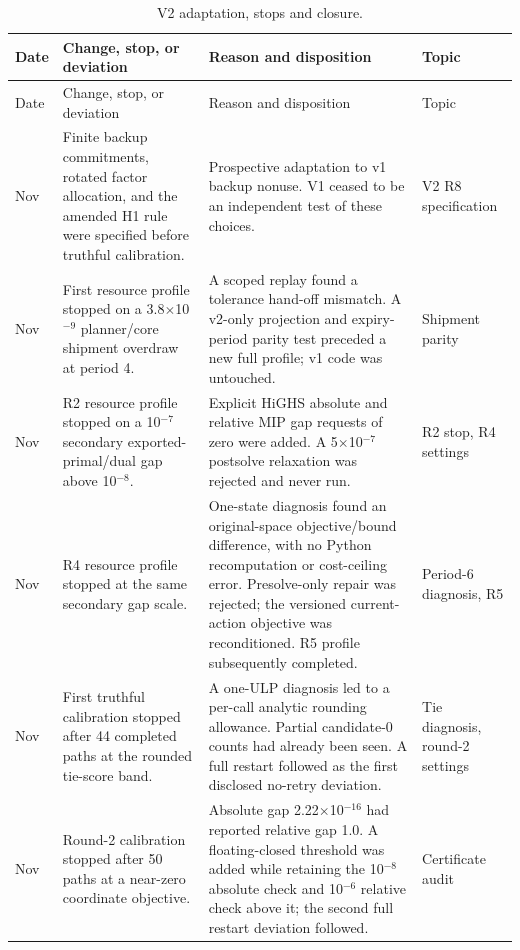 \documentclass[preprint,11pt,authoryear]{elsarticle}
\begin{document}
\begingroup\small\setlength{\tabcolsep}{4pt}\renewcommand{\arraystretch}{1.18}
\renewcommand{\thetable}{C2}
\begin{longtable}{>{\raggedright\arraybackslash}p{1.1cm}>{\raggedright\arraybackslash}p{4.6cm}>{\raggedright\arraybackslash}p{6.2cm}>{\raggedright\arraybackslash}p{2.7cm}}
\caption{V2 adaptation, stops and closure.}\label{tab:deviations2}\\
\toprule
Date & Change, stop, or deviation & Reason and disposition & Topic \\
\midrule
\endfirsthead
Date & Change, stop, or deviation & Reason and disposition & Topic \\
\midrule
\endhead
\bottomrule\endfoot
12 Nov & Finite backup commitments, rotated factor allocation, and the amended H1 rule were specified before truthful calibration. & Prospective adaptation to v1 backup nonuse. V1 ceased to be an independent test of these choices. & V2 R8 specification \\
12 Nov & First resource profile stopped on a 3.8$\times$10$^{-9}$ planner/core shipment overdraw at period 4. & A scoped replay found a tolerance hand-off mismatch. A v2-only projection and expiry-period parity test preceded a new full profile; v1 code was untouched. & Shipment parity \\
12 Nov & R2 resource profile stopped on a 10$^{-7}$ secondary exported-primal/dual gap above 10$^{-8}$. & Explicit HiGHS absolute and relative MIP gap requests of zero were added. A 5$\times$10$^{-7}$ postsolve relaxation was rejected and never run. & R2 stop, R4 settings \\
12 Nov & R4 resource profile stopped at the same secondary gap scale. & One-state diagnosis found an original-space objective/bound difference, with no Python recomputation or cost-ceiling error. Presolve-only repair was rejected; the versioned current-action objective was reconditioned. R5 profile subsequently completed. & Period-6 diagnosis, R5 \\
12 Nov & First truthful calibration stopped after 44 completed paths at the rounded tie-score band. & A one-ULP diagnosis led to a per-call analytic rounding allowance. Partial candidate-0 counts had already been seen. A full restart followed as the first disclosed no-retry deviation. & Tie diagnosis, round-2 settings \\
12 Nov & Round-2 calibration stopped after 50 paths at a near-zero coordinate objective. & Absolute gap 2.22$\times$10$^{-16}$ had reported relative gap 1.0. A floating-closed threshold was added while retaining the 10$^{-8}$ absolute check and 10$^{-6}$ relative check above it; the second full restart deviation followed. & Certificate audit \\

\end{longtable}
\end{document}
